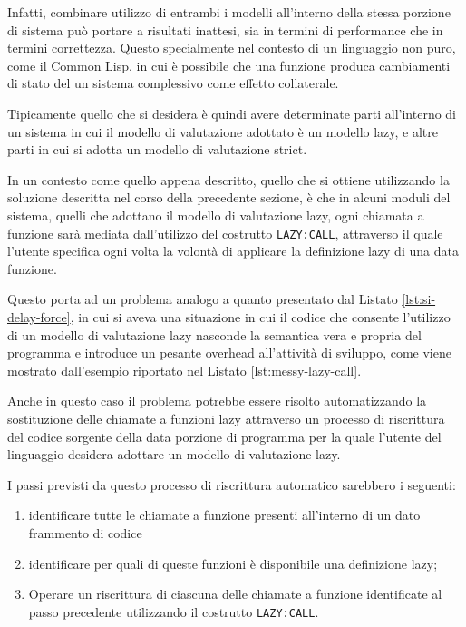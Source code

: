 Infatti, combinare utilizzo di entrambi i modelli all'interno della stessa
porzione di sistema può portare a risultati inattesi, sia in termini di
performance che in termini correttezza. Questo specialmente nel contesto di un
linguaggio non puro, come il Common Lisp, in cui è possibile che una funzione
produca cambiamenti di stato del un sistema complessivo come effetto
collaterale.

Tipicamente quello che si desidera è quindi avere determinate parti all'interno
di un sistema in cui il modello di valutazione adottato è un modello lazy, e
altre parti in cui si adotta un modello di valutazione strict.

In un contesto come quello appena descritto, quello che si ottiene utilizzando
la soluzione descritta nel corso della precedente sezione, è che in alcuni
moduli del sistema, quelli che adottano il modello di valutazione lazy, ogni
chiamata a funzione sarà mediata dall'utilizzo del costrutto \texttt{LAZY:CALL},
attraverso il quale l'utente specifica ogni volta la volontà di applicare la
definizione lazy di una data funzione.

Questo porta ad un problema analogo a quanto presentato dal Listato
\ref{lst:si-delay-force}, in cui si aveva una situazione in cui il codice che
consente l’utilizzo di un modello di valutazione lazy nasconde la semantica vera
e propria del programma e introduce un pesante overhead all'attività di
sviluppo, come viene mostrato dall'esempio riportato nel Listato
\ref{lst:messy-lazy-call}.

Anche in questo caso il problema potrebbe essere risolto automatizzando la
sostituzione delle chiamate a funzioni lazy attraverso un processo di
riscrittura del codice sorgente della data porzione di programma per la quale
l'utente del linguaggio desidera adottare un modello di valutazione lazy.

I passi previsti da questo processo di riscrittura automatico sarebbero i
seguenti:

\begin{enumerate}

\item identificare tutte le chiamate a funzione presenti all'interno di un dato
frammento di codice

\item identificare per quali di queste funzioni è disponibile una definizione
lazy;

\item Operare un riscrittura di ciascuna delle chiamate a funzione identificate
al passo precedente utilizzando il costrutto \texttt{LAZY:CALL}.

\end{enumerate}

